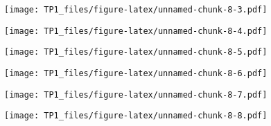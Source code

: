 \documentclass[
]{article}
\newenvironment{Shaded}{\begin{snugshade}}{\end{snugshade}}
\newcommand{\CommentTok}[1]{\textcolor[rgb]{0.56,0.35,0.01}{\textit{#1}}}
\newcommand{\DataTypeTok}[1]{\textcolor[rgb]{0.13,0.29,0.53}{#1}}
\newcommand{\KeywordTok}[1]{\textcolor[rgb]{0.13,0.29,0.53}{\textbf{#1}}}
\newcommand{\NormalTok}[1]{#1}
\newcommand{\OperatorTok}[1]{\textcolor[rgb]{0.81,0.36,0.00}{\textbf{#1}}}
\newcommand{\StringTok}[1]{\textcolor[rgb]{0.31,0.60,0.02}{#1}}
\begin{document}
\texttt{[image: TP1\_files/figure-latex/unnamed-chunk-8-3.pdf]}

\begin{Shaded}
\end{Shaded}

\texttt{[image: TP1\_files/figure-latex/unnamed-chunk-8-4.pdf]}

\begin{Shaded}
\end{Shaded}

\texttt{[image: TP1\_files/figure-latex/unnamed-chunk-8-5.pdf]}

\begin{Shaded}
\end{Shaded}

\texttt{[image: TP1\_files/figure-latex/unnamed-chunk-8-6.pdf]}

\begin{Shaded}
\end{Shaded}

\texttt{[image: TP1\_files/figure-latex/unnamed-chunk-8-7.pdf]}

\begin{Shaded}
\end{Shaded}

\texttt{[image: TP1\_files/figure-latex/unnamed-chunk-8-8.pdf]}
\end{document}
